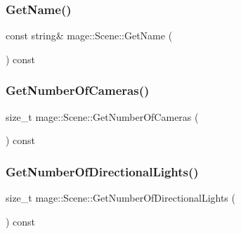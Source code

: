 \hypertarget{classmage_1_1_scene_a6afd25c30d08eb579eb430af49cf8fc0}{}\label{classmage_1_1_scene_a6afd25c30d08eb579eb430af49cf8fc0} 
\subsubsection{\texorpdfstring{Get\+Name()}{GetName()}}
{\footnotesize\ttfamily const string\& mage\+::\+Scene\+::\+Get\+Name (\begin{DoxyParamCaption}{ }\end{DoxyParamCaption}) const\hspace{0.3cm}{\ttfamily [noexcept]}}

\hypertarget{classmage_1_1_scene_a7b0a49510128a1e9dbc64a657fe9ec7a}{}\label{classmage_1_1_scene_a7b0a49510128a1e9dbc64a657fe9ec7a} 
\subsubsection{\texorpdfstring{Get\+Number\+Of\+Cameras()}{GetNumberOfCameras()}}
{\footnotesize\ttfamily size\+\_\+t mage\+::\+Scene\+::\+Get\+Number\+Of\+Cameras (\begin{DoxyParamCaption}{ }\end{DoxyParamCaption}) const\hspace{0.3cm}{\ttfamily [noexcept]}}

\hypertarget{classmage_1_1_scene_afd3b87bc2e2212890ff4c7a761c29684}{}\label{classmage_1_1_scene_afd3b87bc2e2212890ff4c7a761c29684} 
\subsubsection{\texorpdfstring{Get\+Number\+Of\+Directional\+Lights()}{GetNumberOfDirectionalLights()}}
{\footnotesize\ttfamily size\+\_\+t mage\+::\+Scene\+::\+Get\+Number\+Of\+Directional\+Lights (\begin{DoxyParamCaption}{ }\end{DoxyParamCaption}) const\hspace{0.3cm}{\ttfamily [noexcept]}}


